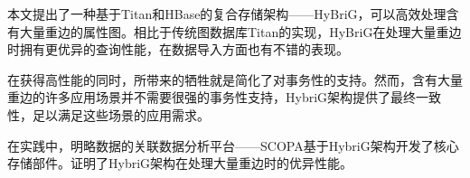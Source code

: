 
 \label{chap:conclusion}
本文提出了一种基于Titan和HBase的复合存储架构——HyBriG，可以高效处理含有大量重边的属性图。相比于传统图数据库Titan的实现，HyBriG在处理大量重边时拥有更优异的查询性能，在数据导入方面也有不错的表现。

在获得高性能的同时，所带来的牺牲就是简化了对事务性的支持。然而，含有大量重边的许多应用场景并不需要很强的事务性支持，HybriG架构提供了最终一致性，足以满足这些场景的应用需求。

在实践中，明略数据的关联数据分析平台——SCOPA基于HybriG架构开发了核心存储部件。证明了HybriG架构在处理大量重边时的优异性能。



